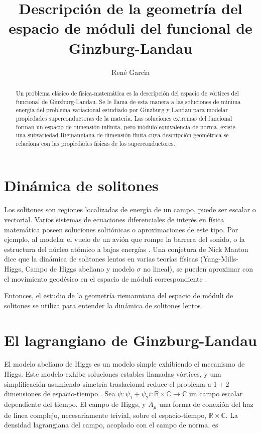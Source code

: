 \documentclass[spanish]{amsart}
\title{Descripción de la geometría del espacio de móduli del funcional
  de Ginzburg-Landau}
\author{Ren\'e Garc\'{\i}a}
\newcommand*{\R}{\mathbb{R}}
\newcommand*{\C}{\mathbb{C}}
\begin{document}
\maketitle
\begin{abstract}
  Un problema clásico de física-matemática es la descripción del
  espacio de vórtices del funcional de Ginzburg-Landau. Se le llama de
  esta manera a las soluciones de mínima energía del problema
  variacional estudiado por Ginzburg y Landau para modelar propiedades
  superconductoras de la materia. Las soluciones extremas del
  funcional forman un espacio de dimensión infinita, pero módulo
  equivalencia de norma, existe una subvariedad Riemanniana de
  dimensión finita cuya descripción geométrica se relaciona con las
  propiedades físicas de los superconductores.
\end{abstract}


\section{Dinámica de solitones}
\label{sec:soliton-dynamics}

Los solitones son regiones localizadas de energía de un campo, puede
ser escalar o vectorial. Varios sistemas de ecuaciones diferenciales
de interés en física matemática poseen soluciones solitónicas o
aproximaciones de este tipo. Por
ejemplo, al modelar el vuelo de un avión que rompe la barrera del
sonido, o la estructura del núcleo atómico a bajas energías
\cite{manton2004topological}. Una conjetura de Nick Manton dice que la
dinámica de solitones lentos en varias teorías físicas
(Yang-Mills-Higgs, Campo de Higgs abeliano y modelo \(\sigma \) no
lineal), se pueden aproximar con el movimiento geodésico en el espacio
de móduli correspondiente \cite{manton198254}. 

Entonces, el estudio de la geometría riemanniana del espacio de móduli
de solitones se utiliza para entender la dinámica de solitones
lentos \cite{samols1992}.
 
\section{El lagrangiano de Ginzburg-Landau}
\label{sec:GL-lagrangiano}

El modelo abeliano de Higgs \cite{PhysRev.145.1156} es un modelo
simple exhibiendo el mecanismo de Higgs. Este modelo exhibe soluciones
estables llamadas vórtices, y una simplificación asumiendo simetría
traslacional reduce el problema a \(1 + 2 \) dimensiones de
espacio-tiempo \cite{samols1992}. Sea \(\psi: \psi_1 + \psi_2i: \R\times\C \to
\C\) un campo escalar dependiente del tiempo. El campo de Higgs, y
\(A_{\mu} \) una forma de conexión del haz de línea complejo,
necesariamente trivial,
sobre el espacio-tiempo, \(\R\times\C \). La densidad lagrangiana del
campo, acoplado con el campo de norma, es
\end{document}
